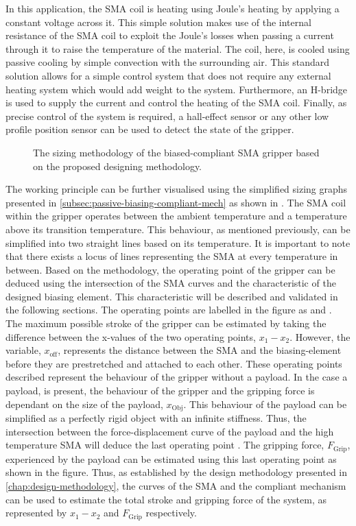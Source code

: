 In this application, the SMA coil is heating using Joule's heating by applying a constant voltage across it. This simple solution makes use of the internal resistance of the SMA coil to exploit the Joule's losses when passing a current through it to raise the temperature of the material. The coil, here, is cooled using passive cooling by simple convection with the surrounding air. This standard solution allows for a simple control system that does not require any external heating system which would add weight to the system. Furthermore, an H-bridge is used to supply the current and control the heating of the SMA coil. Finally, as precise control of the system is required, a hall-effect sensor or any other low profile position sensor can be used to detect the state of the gripper.

\begin{figure}[hbt!] %
  \centering
  \resizebox{0.6\textwidth}{!}{}
  \caption{The sizing methodology of the biased-compliant SMA gripper based on the proposed designing methodology.}
  \label{fig:mandrel-gripperwp}
\end{figure}

The working principle can be further visualised using the simplified sizing graphs presented in \cref{subsec:passive-biasing-compliant-mech} as shown in \todocite. The SMA coil within the gripper operates between the ambient temperature and a temperature above its transition temperature. This behaviour, as mentioned previously, can be simplified into two straight lines based on its temperature. It is important to note that there exists a locus of lines representing the SMA at every temperature in between. Based on the methodology, the operating point of the gripper can be deduced using the intersection of the SMA curves and the characteristic of the designed biasing element. This characteristic will be described and validated in the following sections. The operating points are labelled in the figure as  and . The maximum possible stroke of the gripper can be estimated by taking the difference between the x-values of the two operating points, $x_1-x_2$. However, the variable, $x_\mathrm{off}$, represents the distance between the SMA and the biasing-element before they are prestretched and attached to each other. These operating points described represent the behaviour of the gripper without a payload. In the case a payload, is present, the behaviour of the gripper and the gripping force is dependant on the size of the payload, $x_\mathrm{Obj}$. This behaviour of the payload can be simplified as a perfectly rigid object with an infinite stiffness. Thus, the intersection between the force-displacement curve of the payload and the high temperature SMA will deduce the last operating point . The gripping force, $F_\mathrm{Grip}$, experienced by the payload can be estimated using this last operating point as shown in the figure. Thus, as established by the design methodology presented in \cref{chap:design-methodology}, the curves of the SMA and the compliant mechanism can be used to estimate the total stroke and gripping force of the system, as represented by $x_1-x_2$ and $F_\mathrm{Grip}$ respectively.
